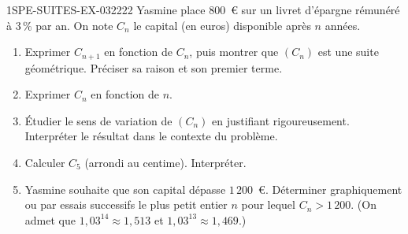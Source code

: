 \begin{exercice}{1SPE-SUITES-EX-032}{2}{22}
Yasmine place $800$~\euro{} sur un livret d'épargne rémunéré à $3\,\%$ par an. On note $C_n$ le capital (en euros) disponible après $n$ années.

\begin{enumerate}
  \item Exprimer $C_{n+1}$ en fonction de $C_n$, puis montrer que $(C_n)$ est une suite géométrique. Préciser sa raison et son premier terme.

  \item Exprimer $C_n$ en fonction de $n$.

  \item Étudier le sens de variation de $(C_n)$ en justifiant rigoureusement. Interpréter le résultat dans le contexte du problème.

  \item Calculer $C_5$ (arrondi au centime). Interpréter.

  \item Yasmine souhaite que son capital dépasse $1\,200$~\euro{}. Déterminer graphiquement ou par essais successifs le plus petit entier $n$ pour lequel $C_n > 1\,200$. (On admet que $1{,}03^{14} \approx 1{,}513$ et $1{,}03^{13} \approx 1{,}469$.)
\end{enumerate}
\end{exercice}
